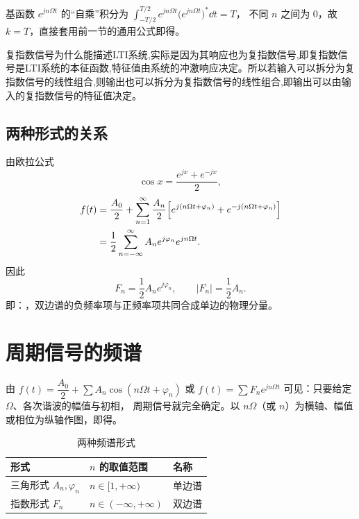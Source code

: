 \begin{note}
\quad 基函数 $e^{jn\Omega t}$ 的“自乘”积分为
$\int_{-T/2}^{T/2}e^{jn\Omega t}\bigl(e^{jn\Omega t}\bigr)^{*}\dd t=T$，
不同 $n$ 之间为 $0$，故 $k=T$，直接套用前一节的通用公式即得。
\end{note}
\begin{note}
 复指数信号为什么能描述LTI系统,实际是因为其响应也为复指数信号,即复指数信号是LTI系统的本征函数,特征值由系统的冲激响应决定。所以若输入可以拆分为复指数信号的线性组合,则输出也可以拆分为复指数信号的线性组合,即输出可以由输入的复指数信号的特征值决定。
\end{note}
\subsection{两种形式的关系}

由欧拉公式
\[
    \cos x=\frac{e^{jx}+e^{-jx}}{2},
\]
\[
\begin{aligned}
    f(t)&=\frac{A_0}{2}+\sum_{n=1}^{\infty}\frac{A_n}{2}
          \Bigl[e^{j(n\Omega t+\varphi_n)}+e^{-j(n\Omega t+\varphi_n)}\Bigr]\\
        &=\frac{1}{2}\sum_{n=-\infty}^{\infty}A_n e^{j\varphi_n}e^{jn\Omega t}.
\end{aligned}
\]
因此
\[
    F_n=\frac{1}{2}A_n e^{j\varphi_n},\qquad |F_n|=\frac{1}{2}A_n .
\]
即：，双边谱的负频率项与正频率项共同合成单边的物理分量。

\section{周期信号的频谱}

由 $f(t)=\dfrac{A_0}{2}+\sum A_n\cos(n\Omega t+\varphi_n)$ 或
$f(t)=\sum F_ne^{jn\Omega t}$ 可见：只要给定 $\Omega$、各次谐波的幅值与初相，
周期信号就完全确定。以 $n\Omega$（或 $n$）为横轴、幅值或相位为纵轴作图，即得。

\begin{table}[htbp]
\centering
\caption{两种频谱形式}
\begin{tabular}{@{}lll@{}}
\toprule
形式 & $n$ 的取值范围 & 名称 \\
\midrule
三角形式 $A_n,\varphi_n$ & $n\in[1,+\infty)$ & 单边谱 \\
指数形式 $F_n$ & $n\in(-\infty,+\infty)$ & 双边谱 \\
\bottomrule
\end{tabular}
\end{table}


